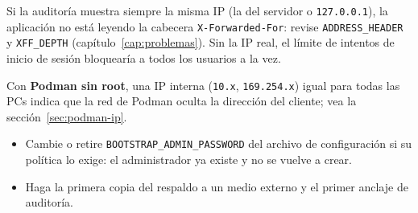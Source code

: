 \begin{nota}[Punto 6]
	Si la auditoría muestra siempre la misma IP (la del servidor o \texttt{127.0.0.1}), la
	aplicación no está leyendo la cabecera \texttt{X-Forwarded-For}: revise
	\texttt{ADDRESS\_HEADER} y \texttt{XFF\_DEPTH} (capítulo~\ref{cap:problemas}). Sin la IP real,
	el límite de intentos de inicio de sesión bloquearía a todos los usuarios a la vez.

	Con \textbf{Podman sin root}, una IP interna (\texttt{10.x}, \texttt{169.254.x}) igual para
	todas las PCs indica que la red de Podman oculta la dirección del cliente; vea la
	sección~\ref{sec:podman-ip}.
\end{nota}

\begin{aviso}
	\begin{itemize}
		\item Cambie o retire \texttt{BOOTSTRAP\_ADMIN\_PASSWORD} del archivo de configuración si su
		      política lo exige: el administrador ya existe y no se vuelve a crear.
		\item Haga la primera copia del respaldo a un medio externo y el primer anclaje de
		      auditoría.
	\end{itemize}
\end{aviso}
